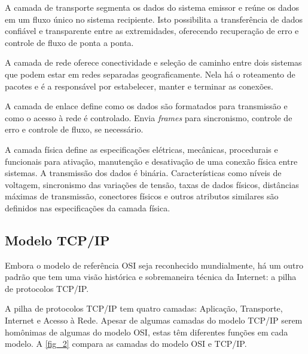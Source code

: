 \documentclass[
12pt,				%
openright,			%
oneside,			%
a4paper,			%
brazil,				%
]{abntex2}
\begin{document}
	\par A camada de transporte segmenta os dados do sistema emissor e reúne os dados em um fluxo único no sistema recipiente. Isto possibilita a transferência de dados confiável e transparente entre as extremidades, oferecendo recuperação de erro e controle de fluxo de ponta a ponta. 
	
	\par A camada de rede oferece conectividade e seleção de caminho entre dois sistemas que podem estar em redes separadas geograficamente. Nela há o roteamento de pacotes e é a responsável por estabelecer, manter e terminar as conexões.
	
	\par A camada de enlace define como os dados são formatados para transmissão e como o acesso à rede é controlado. Envia \textit{frames} para sincronismo, controle de erro e controle de fluxo, se necessário. 
	
	\par A camada física define as especificações elétricas, mecânicas, procedurais e funcionais para ativação, manutenção e desativação de uma conexão física entre sistemas. A transmissão dos dados é binária. Características como níveis de voltagem, sincronismo das variações de tensão, taxas de dados físicos, distâncias máximas de transmissão, conectores físicos e outros atributos similares são definidos nas especificações da camada física.
	
	
	\subsection{Modelo TCP/IP}
	
	\par Embora o modelo de referência OSI seja reconhecido mundialmente, há um outro padrão que tem uma visão histórica e sobremaneira técnica da Internet: a pilha de protocolos TCP/IP.
	
	\par A pilha de protocolos TCP/IP tem quatro camadas: Aplicação, Transporte, Internet e Acesso à Rede. Apesar de algumas camadas do modelo TCP/IP serem homônimas de algumas do modelo OSI, estas têm diferentes funções em cada modelo. A \autoref{fig_2} compara as camadas do modelo OSI e TCP/IP.
	
\end{document}
